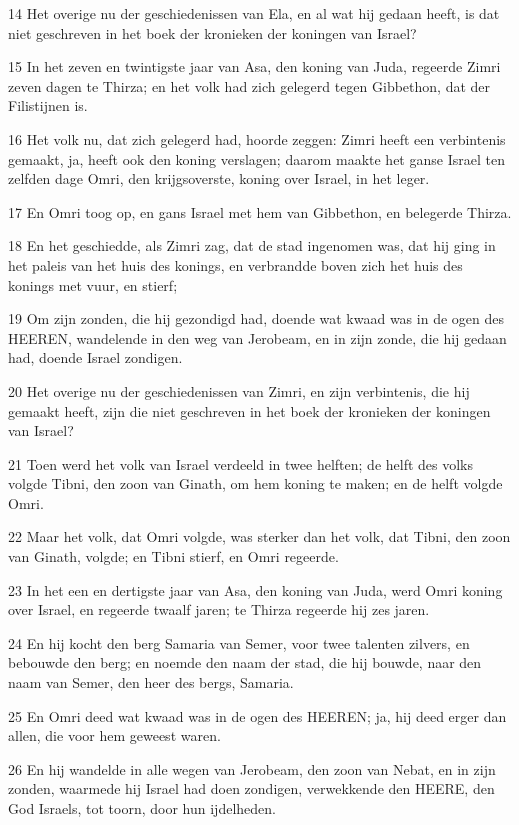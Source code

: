 \par 14 Het overige nu der geschiedenissen van Ela, en al wat hij gedaan heeft, is dat niet geschreven in het boek der kronieken der koningen van Israel?
\par 15 In het zeven en twintigste jaar van Asa, den koning van Juda, regeerde Zimri zeven dagen te Thirza; en het volk had zich gelegerd tegen Gibbethon, dat der Filistijnen is.
\par 16 Het volk nu, dat zich gelegerd had, hoorde zeggen: Zimri heeft een verbintenis gemaakt, ja, heeft ook den koning verslagen; daarom maakte het ganse Israel ten zelfden dage Omri, den krijgsoverste, koning over Israel, in het leger.
\par 17 En Omri toog op, en gans Israel met hem van Gibbethon, en belegerde Thirza.
\par 18 En het geschiedde, als Zimri zag, dat de stad ingenomen was, dat hij ging in het paleis van het huis des konings, en verbrandde boven zich het huis des konings met vuur, en stierf;
\par 19 Om zijn zonden, die hij gezondigd had, doende wat kwaad was in de ogen des HEEREN, wandelende in den weg van Jerobeam, en in zijn zonde, die hij gedaan had, doende Israel zondigen.
\par 20 Het overige nu der geschiedenissen van Zimri, en zijn verbintenis, die hij gemaakt heeft, zijn die niet geschreven in het boek der kronieken der koningen van Israel?
\par 21 Toen werd het volk van Israel verdeeld in twee helften; de helft des volks volgde Tibni, den zoon van Ginath, om hem koning te maken; en de helft volgde Omri.
\par 22 Maar het volk, dat Omri volgde, was sterker dan het volk, dat Tibni, den zoon van Ginath, volgde; en Tibni stierf, en Omri regeerde.
\par 23 In het een en dertigste jaar van Asa, den koning van Juda, werd Omri koning over Israel, en regeerde twaalf jaren; te Thirza regeerde hij zes jaren.
\par 24 En hij kocht den berg Samaria van Semer, voor twee talenten zilvers, en bebouwde den berg; en noemde den naam der stad, die hij bouwde, naar den naam van Semer, den heer des bergs, Samaria.
\par 25 En Omri deed wat kwaad was in de ogen des HEEREN; ja, hij deed erger dan allen, die voor hem geweest waren.
\par 26 En hij wandelde in alle wegen van Jerobeam, den zoon van Nebat, en in zijn zonden, waarmede hij Israel had doen zondigen, verwekkende den HEERE, den God Israels, tot toorn, door hun ijdelheden.

